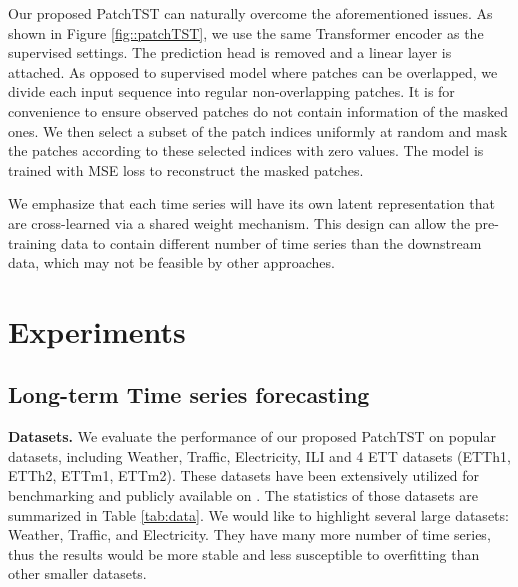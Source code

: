 \documentclass{article} \usepackage{iclr2023_conference,times}
\begin{document}
Our proposed PatchTST can naturally overcome the aforementioned issues. As shown in Figure \ref{fig::patchTST}, we use the same Transformer encoder as the supervised settings. The prediction head is removed and a  linear layer is attached. As opposed to supervised model where patches can be overlapped, we divide each input sequence into regular non-overlapping patches. It is for convenience to ensure observed patches do not contain information of the masked ones. We then select a subset of the patch indices uniformly at random and mask the patches according to these selected indices with zero values. The model is trained with MSE loss to reconstruct the masked patches.

We emphasize that each time series will have its own latent representation that are cross-learned via a shared weight mechanism. This design can allow the pre-training data to contain different number of time series than the downstream data, which may not be feasible by other approaches. 


\section{Experiments}

\subsection{Long-term Time series forecasting}
\label{subsection::time series forecasting}

\textbf{Datasets.} We evaluate the performance of our proposed PatchTST on  popular datasets, including Weather, Traffic, Electricity, ILI and 4 ETT datasets (ETTh1, ETTh2, ETTm1, ETTm2). These datasets have been extensively utilized for benchmarking and publicly available on \citep{autoformer}. The statistics of those datasets are summarized in Table \ref{tab:data}. We would like to highlight several large datasets: Weather, Traffic, and Electricity. They have many more number of time series, thus the results would be more stable and less susceptible to overfitting than other smaller datasets.



\begin{table}[htbp!]
\centering
{}
\caption{Statistics of popular datasets for benchmark.}
\label{tab:data}
\end{table}
\end{document}
